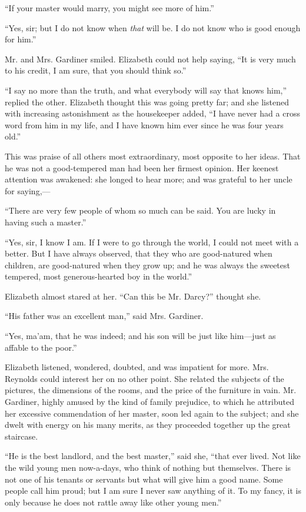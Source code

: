 \documentclass[12pt]{book}
\begin{document}
``If your master would marry, you might see more of him.''

``Yes, sir; but I do not know when \textit{that} will be. I do not know who is good enough for him.''

Mr. and Mrs. Gardiner smiled. Elizabeth could not help saying, ``It is very much to his credit, I am sure, that you should think so.''

``I say no more than the truth, and what everybody will say that knows him,'' replied the other. Elizabeth thought this was going pretty far; and she listened with increasing astonishment as the housekeeper added, ``I have never had a cross word from him in my life, and I have known him ever since he was four years old.''

This was praise of all others most extraordinary, most opposite to her ideas. That he was not a good-tempered man had been her firmest opinion. Her keenest attention was awakened: she longed to hear more; and was grateful to her uncle for saying,---

``There are very few people of whom so much can be said. You are lucky in having such a master.''

``Yes, sir, I know I am. If I were to go through the world, I could not meet with a better. But I have always observed, that they who are good-natured when children, are good-natured when they grow up; and he was always the sweetest tempered, most generous-hearted boy in the world.''

Elizabeth almost stared at her. ``Can this be Mr. Darcy?'' thought she.

``His father was an excellent man,'' said Mrs. Gardiner.

``Yes, ma'am, that he was indeed; and his son will be just like him---just as affable to the poor.''

Elizabeth listened, wondered, doubted, and was impatient for more. Mrs. Reynolds could interest her on no other point. She related the subjects of the pictures, the dimensions of the rooms, and the price of the furniture in vain. Mr. Gardiner, highly amused by the kind of family prejudice, to which he attributed her excessive commendation of her master, soon led again to the subject; and she dwelt with energy on his many merits, as they proceeded together up the great staircase.

``He is the best landlord, and the best master,'' said she, ``that ever lived. Not like the wild young men now-a-days, who think of nothing but themselves. There is not one of his tenants or servants but what will give him a good name. Some people call him proud; but I am sure I never saw anything of it. To my fancy, it is only because he does not rattle away like other young men.''
\end{document}
